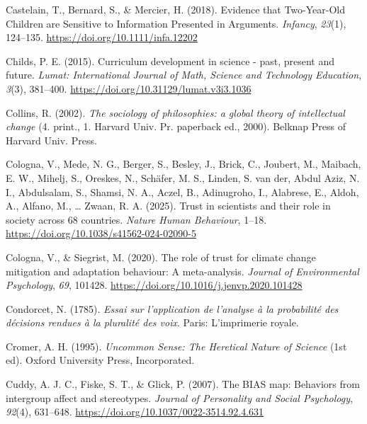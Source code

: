 \documentclass[
  man,
  floatsintext,
  longtable,
  nolmodern,
  notxfonts,
  notimes,
  colorlinks=true,linkcolor=blue,citecolor=blue,urlcolor=blue]{apa7}
\newlength{\cslhangindent}
\newenvironment{CSLReferences}[2] %
 {\begin{list}{}{%
  \setlength{\itemindent}{0pt}
  \setlength{\leftmargin}{0pt}
  \setlength{\parsep}{0pt}
  \ifodd #1
   \setlength{\leftmargin}{\cslhangindent}
   \setlength{\itemindent}{-1\cslhangindent}
  \fi
  \setlength{\itemsep}{#2\baselineskip}}}
 {\end{list}}
\begin{document}
\begin{CSLReferences}{1}{0}
Castelain, T., Bernard, S., \& Mercier, H. (2018). Evidence that
Two{-}Year{-}Old Children are Sensitive to Information Presented in
Arguments. \emph{Infancy}, \emph{23}(1), 124--135.
\url{https://doi.org/10.1111/infa.12202}

Childs, P. E. (2015). Curriculum development in science - past, present
and future. \emph{Lumat: International Journal of Math, Science and
Technology Education}, \emph{3}(3), 381--400.
\url{https://doi.org/10.31129/lumat.v3i3.1036}

Collins, R. (2002). \emph{The sociology of philosophies: a global theory
of intellectual change} (4. print., 1. Harvard Univ. Pr. paperback ed.,
2000). Belknap Press of Harvard Univ. Press.

Cologna, V., Mede, N. G., Berger, S., Besley, J., Brick, C., Joubert,
M., Maibach, E. W., Mihelj, S., Oreskes, N., Schäfer, M. S., Linden, S.
van der, Abdul Aziz, N. I., Abdulsalam, S., Shamsi, N. A., Aczel, B.,
Adinugroho, I., Alabrese, E., Aldoh, A., Alfano, M., \ldots{} Zwaan, R.
A. (2025). Trust in scientists and their role in society across 68
countries. \emph{Nature Human Behaviour}, 1--18.
\url{https://doi.org/10.1038/s41562-024-02090-5}

Cologna, V., \& Siegrist, M. (2020). The role of trust for climate
change mitigation and adaptation behaviour: A meta-analysis.
\emph{Journal of Environmental Psychology}, \emph{69}, 101428.
\url{https://doi.org/10.1016/j.jenvp.2020.101428}

Condorcet, N. (1785). \emph{Essai sur l'application de l'analyse à la
probabilité des décisions rendues à la pluralité des voix}. Paris:
L{'}imprimerie royale.

Cromer, A. H. (1995). \emph{Uncommon Sense: The Heretical Nature of
Science} (1st ed). Oxford University Press, Incorporated.

Cuddy, A. J. C., Fiske, S. T., \& Glick, P. (2007). The BIAS map:
Behaviors from intergroup affect and stereotypes. \emph{Journal of
Personality and Social Psychology}, \emph{92}(4), 631--648.
\url{https://doi.org/10.1037/0022-3514.92.4.631}


\end{CSLReferences}
\end{document}
